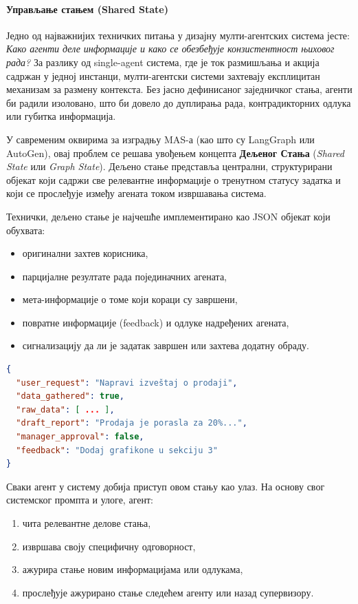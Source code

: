\paragraph*{Управљање стањем (Shared State)}

Једно од најважнијих техничких питања у дизајну мулти-агентских система јесте:
\textit{Како агенти деле информације и како се обезбеђује конзистентност њиховог рада?}
За разлику од single-agent система, где је ток размишљања и акција садржан у једној инстанци,
мулти-агентски системи захтевају експлицитан механизам за размену контекста.
Без јасно дефинисаног заједничког стања, агенти би радили изоловано, што би довело до
дуплирања рада, контрадикторних одлука или губитка информација.

У савременим оквирима за изградњу MAS-а (као што су LangGraph или AutoGen),
овај проблем се решава увођењем концепта \textbf{Дељеног Стања} (\textit{Shared State} или \textit{Graph State}).
Дељено стање представља централни, структурирани објекат који садржи све релевантне информације
о тренутном статусу задатка и који се прослеђује између агената током извршавања система.

Технички, дељено стање је најчешће имплементирано као JSON објекат који обухвата:
\begin{itemize}
    \item оригинални захтев корисника,
    \item парцијалне резултате рада појединачних агената,
    \item мета-информације о томе који кораци су завршени,
    \item повратне информације (feedback) и одлуке надређених агената,
    \item сигнализацију да ли је задатак завршен или захтева додатну обраду.
\end{itemize}

\begin{lstlisting}[language=json, caption={Primer deljenog stanja u multi-agentskom sistemu}]
{
  "user_request": "Napravi izveštaj o prodaji",
  "data_gathered": true,
  "raw_data": [ ... ],
  "draft_report": "Prodaja je porasla za 20%...",
  "manager_approval": false,
  "feedback": "Dodaj grafikone u sekciju 3"
}
\end{lstlisting}

Сваки агент у систему добија приступ овом стању као улаз.
На основу свог системског промпта и улоге, агент:
\begin{enumerate}
    \item чита релевантне делове стања,
    \item извршава своју специфичну одговорност,
    \item ажурира стање новим информацијама или одлукама,
    \item прослеђује ажурирано стање следећем агенту или назад супервизору.
\end{enumerate}

